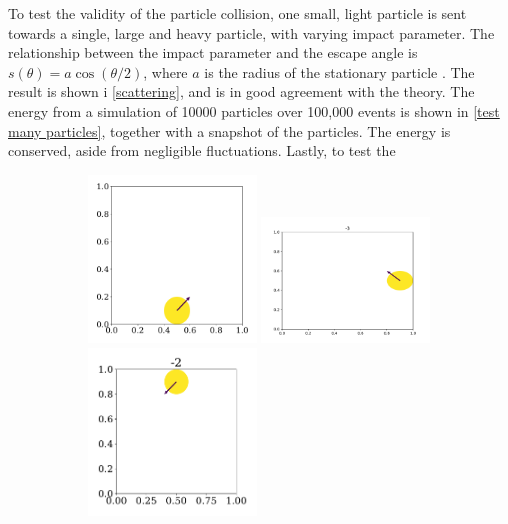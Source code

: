 \documentclass{article}
\begin{document}
    
    To test the validity of the particle collision, one small, light particle is sent towards a single, large and heavy particle, with varying impact parameter.
    The relationship between the impact parameter and the escape angle is $s(\theta) = a \cos(\theta / 2)$, where $a$ is the radius of the stationary particle \cite{klasmek}.
    The result is shown i \autoref{scattering}, and is in good agreement with the theory.
    The energy from a simulation of 10000 particles over 100,000 events is shown in \autoref{test many particles}, together with a snapshot of the particles.
    The energy is conserved, aside from negligible fluctuations.
    Lastly, to test the 
    \begin{figure}[H]
        \centering
        \begin{subfigure}{.35\textwidth}
            \centering
            \includegraphics[width=0.49\textwidth]{../plots/test_case_one_particle/particle-4.pdf}
            \includegraphics[width=0.49\textwidth]{../plots/test_case_one_particle/particle-3.pdf}
            \includegraphics[width=0.49\textwidth]{../plots/test_case_one_particle/particle-2.pdf}

\end{subfigure}
\end{figure}
\end{document}
